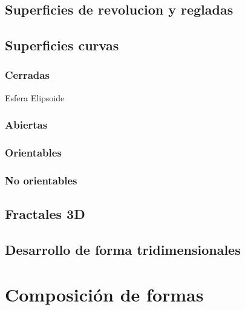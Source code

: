 \documentclass[16pt,]{krantz}
\theoremstyle{definition}
\theoremstyle{definition}
\theoremstyle{definition}
\theoremstyle{definition}
\theoremstyle{remark}
\begin{document}
\hypertarget{superficies-de-revolucion-y-regladas}{%
\section{Superficies de revolucion y regladas}\label{superficies-de-revolucion-y-regladas}}

\hypertarget{superficies-curvas}{%
\section{Superficies curvas}\label{superficies-curvas}}

\hypertarget{cerradas}{%
\subsection{Cerradas}\label{cerradas}}

Esfera Elipsoide

\hypertarget{abiertas}{%
\subsection{Abiertas}\label{abiertas}}

\hypertarget{orientables}{%
\subsection{Orientables}\label{orientables}}

\hypertarget{no-orientables}{%
\subsection{No orientables}\label{no-orientables}}

\hypertarget{fractales-3d}{%
\section{Fractales 3D}\label{fractales-3d}}

\hypertarget{desarrollo-de-forma-tridimensionales}{%
\section{Desarrollo de forma tridimensionales}\label{desarrollo-de-forma-tridimensionales}}

\hypertarget{composiciuxf3n-de-formas}{%
\chapter{Composición de formas}\label{composiciuxf3n-de-formas}}
\end{document}
